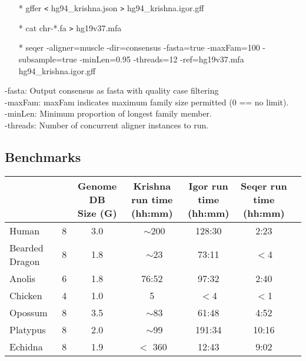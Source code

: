 \documentclass[12pt]{report}
\begin{document}
\begin{enumerate}
	\item[*] gffer \texttt{<} hg94\_krishna.json \texttt{>} hg94\_krishna.igor.gff
	\item[*] cat chr-*.fa \texttt{>} hg19v37.mfa
	\item[*] seqer -aligner=muscle -dir=consensus -fasta=true -maxFam=100 -subsample=true -minLen=0.95 -threads=12 -ref=hg19v37.mfa hg94\_krishna.igor.gff
\end{enumerate}

\noindent -fasta: Output consensus as fasta with quality case filtering\\
-maxFam: maxFam indicates maximum family size permitted (0 == no limit).\\
-minLen: Minimum proportion of longest family member.\\
-threads: Number of concurrent aligner instances to run.


\subsection*{Benchmarks}

\footnotesize  %
\setlength\tabcolsep{1.5pt}
\begin{center}
	\begin{tabular}{|l|c|c|c|c|c|c|}
		\hline
		\thead{Genome}	&	\thead{ Krishna Threads }	&	\thead{Genome DB \\ Size (G)}	& \thead{Krishna run time \\ (hh:mm)}	&	\thead{Igor run time \\ (hh:mm)}	&	\thead{Seqer run time \\ (hh:mm)}  \\
		\hline
		Human	&	8	&	3.0	&	~$\sim$200	&	128:30	&	2:23 \\
		\hline 
		Bearded Dragon	&	8	&	1.8	&	~$\sim$23	&	73:11	&	$<$4 \\
		\hline
		Anolis	& 6	& 1.8	& 76:52	&	97:32	& 2:40	\\
		\hline
		Chicken	&	4	&	1.0	&	5	&	$<$4 & $<$1 \\
		\hline
		Opossum	&	8	&	3.5	&	~$\sim$83	&	61:48	&	4:52 \\
		\hline
		Platypus	&	8	&	2.0	&	~$\sim$99	&	191:34	&	10:16 \\
		\hline
		Echidna	&	8	&	1.9	&	$<$ 360	&	12:43	&	9:02 \\
		\hline
	\end{tabular}
\end{center}
\end{document}
